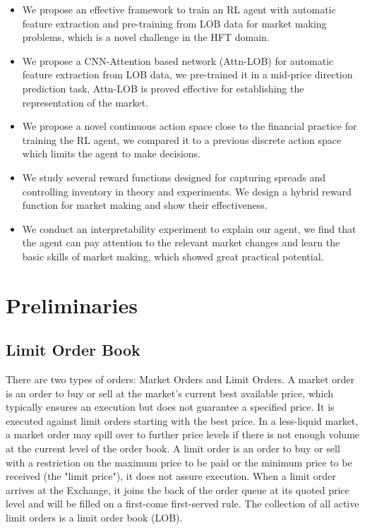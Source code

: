 \documentclass[conference]{IEEEtran}
\begin{document}
\begin{itemize}
    \item We propose an effective framework to train an RL agent with automatic feature extraction and pre-training from LOB data for market making problems, which is a novel challenge in the HFT domain.
    \item We propose a CNN-Attention based network (Attn-LOB) for automatic feature extraction from LOB data, we pre-trained it in a mid-price direction prediction task, Attn-LOB is proved effective for establishing the representation of the market.
    \item We propose a novel continuous action space close to the financial practice for training the RL agent, we compared it to a previous discrete action space which limits the agent to make decisions.
    \item We study several reward functions designed for capturing spreads and controlling inventory in theory and experiments. We design a hybrid reward function for market making and show their effectiveness.
    \item We conduct an interpretability experiment to explain our agent, we find that the agent can pay attention to the relevant market changes and learn the basic skills of market making, which showed great practical potential.
\end{itemize}

\section{Preliminaries}
\subsection{Limit Order Book}
There are two types of orders: Market Orders and Limit Orders. A market order is an order to buy or sell at the market's current best available price, which typically ensures an execution but does not guarantee a specified price. It is executed against limit orders starting with the best price. In a less-liquid market, a market order may spill over to further price levels if there is not enough volume at the current level of the order book. A limit order is an order to buy or sell with a restriction on the maximum price to be paid or the minimum price to be received (the "limit price"), it does not assure execution. When a limit order arrives at the Exchange, it joins the back of the order queue at its quoted price level and will be filled on a first-come first-served rule. The collection of all active limit orders is a limit order book (LOB).
\end{document}

